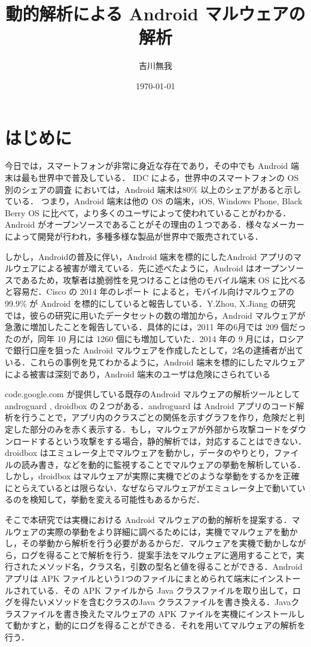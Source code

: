 \documentclass[10pt]{jsarticle}
\title{動的解析による Android マルウェアの解析}
\author{吉川無我}
\date{\today}
\begin{document}
\maketitle
\newpage
\tableofcontents


\newpage
\section{はじめに}
今日では，スマートフォンが非常に身近な存在であり，その中でも Android 端末は最も世界中で普及している． IDC による，世界中のスマートフォンの OS 別のシェアの調査 \cite{osshare} においては，Android 端末は80\% 以上のシェアがあると示している． つまり，Android 端末は他の OS の端末，iOS, Windows Phone, Black Berry OS に比べて，より多くのユーザによって使われていることがわかる．Android がオープンソースであることがその理由の１つである．様々なメーカーによって開発が行われ，多種多様な製品が世界中で販売されている．

しかし，Androidの普及に伴い，Android 端末を標的にしたAndroid アプリのマルウェアによる被害が増えている．先に述べたように，Android はオープンソースであるため，攻撃者は脆弱性を見つけることは他のモバイル端末 OS に比べると容易だ．Cisco の 2014 年のレポート \cite{cisco} によると，モバイル向けマルウェアの 99.9\% が Android を標的にしていると報告している．Y.Zhou, X.Jiang の研究 \cite{dissect} では，彼らの研究に用いたデータセットの数の増加から，Android マルウェアが急激に増加したことを報告している．具体的には，2011 年の6月では 209 個だったのが，同年 10 月には 1260 個にも増加していた．2014 年の 9 月には，ロシアで銀行口座を狙った Android マルウェアを作成したとして，2名の逮捕者が出ている．これらの事例を見てわかるように，Android 端末を標的にしたマルウェアによる被害は深刻であり，Android 端末のユーザは危険にさられている

code.google.com が提供している既存のAndroid マルウェアの解析ツールとして androguard \cite{aguard} , droidbox \cite{dbox} の２つがある．androguard は Android アプリのコード解析を行うことで，アプリ内のクラスごとの関係を示すグラフを作り，危険だと判定した部分のみを赤く表示する．もし，マルウェアが外部から攻撃コードをダウンロードするという攻撃をする場合，静的解析では，対応することはできない．droidbox はエミュレータ上でマルウェアを動かし，データのやりとり，ファイルの読み書き，などを動的に監視することでマルウェアの挙動を解析している．しかし，droidbox はマルウェアが実際に実機でどのような挙動をするかを正確にとらえているとは限らない．なぜならマルウェアがエミュレータ上で動いているのを検知して，挙動を変える可能性もあるからだ．

そこで本研究では実機における Android マルウェアの動的解析を提案する．マルウェアの実際の挙動をより詳細に調べるためには，実機でマルウェアを動かし，その挙動から解析を行う必要があるからだ．マルウェアを実機で動かしながら，ログを得ることで解析を行う．提案手法をマルウェアに適用することで，実行されたメソッド名，クラス名，引数の型名と値を得ることができる．Android アプリは APK ファイルという1つのファイルにまとめられて端末にインストールされている．その APK ファイルから Java クラスファイルを取り出して，ログを得たいメソッドを含むクラスのJava クラスファイルを書き換える．Javaクラスファイルを書き換えたマルウェアの APK ファイルを実機にインストールして動かすと，動的にログを得ることができる．それを用いてマルウェアの解析を行う．
\end{document}
